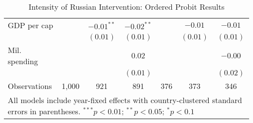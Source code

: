 \begin{table}[h]
\begin{center}
\begin{tabular}{l c c c c c c}
\quad GDP per cap     &               & $-0.01^{**}$  & $-0.02^{**}$  &             & $-0.01$      & $-0.01$       \\
                      &               & $(0.01)$      & $(0.01)$      &             & $(0.01)$     & $(0.01)$      \\
\quad Mil. spending   &               &               & $0.02$        &             &              & $-0.00$       \\
                      &               &               & $(0.01)$      &             &              & $(0.02)$      \\
\hline
Observations          & 1,000         & 921           & 891           & 376         & 373          & 346           \\
\hline
\multicolumn{7}{l}{\scriptsize{All models include year-fixed effects with country-clustered standard errors in parentheses. $^{***}p<0.01$; $^{**}p<0.05$; $^{*}p<0.1$}}
\end{tabular}
\caption{Intensity of Russian Intervention: Ordered Probit Results}
\label{table:model}
\end{center}
\end{table}
